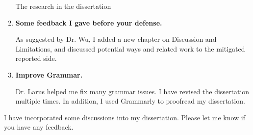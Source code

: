\documentclass{article}
\begin{document}
\begin{enumerate}
The research in the dissertation 


\item \textbf{Some feedback I gave before your defense.}

As suggested by Dr. Wu, I added a new chapter on Discussion and Limitations, and discussed potential ways and related work to the mitigated reported side.

\item \textbf{Improve Grammar.}

Dr. Larus helped me fix many grammar issues. I have revised the dissertation multiple times. In addition, I used Grammarly to proofread my dissertation.
\end{enumerate}

I have incorporated some discussions into my dissertation. Please let me know if you have any feedback.
\end{document}
